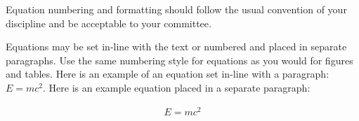 Equation numbering and formatting should follow the usual convention of your discipline and be acceptable to your committee.

Equations may be set in-line with the text or numbered and placed in separate paragraphs.
Use the same numbering style for equations as you would for figures and tables.
Here is an example of an equation set in-line with a paragraph: $E = mc^{2}$.
Here is an example equation placed in a separate paragraph:

\begin{align}
	E = mc^{2}
\end{align}
